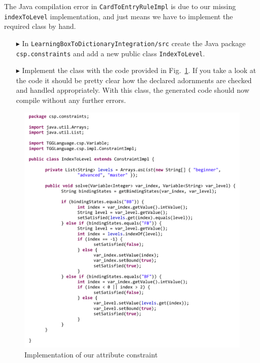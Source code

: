 The Java compilation error in \texttt{Card\-To\-Entry\-Rule\-Impl} is due to our missing \texttt{indexToLevel} implementation, and just means we have to implement the required class by hand.

\begin{enumerate}
\item[$\blacktriangleright$] In \texttt{LearningBox\-To\-Dictionary\-Integration/src} create the Java package \texttt{csp.constraints} and add a new public class \texttt{IndexToLevel}.
\item[$\blacktriangleright$] Implement the class with the code provided in Fig.~\ref{fig:indexToLevel}.
If you take a look at the code it should be pretty clear how the declared adornments are checked and handled appropriately.
With this class, the generated code should now compile without any further errors.
\end{enumerate}

\begin{figure}[htbp]
\begin{center}
  \includegraphics[height=0.64\textheight]{pics/tggBilder/transformation/tgg23}
  \caption{Implementation of our attribute constraint}  
  \label{fig:indexToLevel}
\end{center}
\end{figure} 

